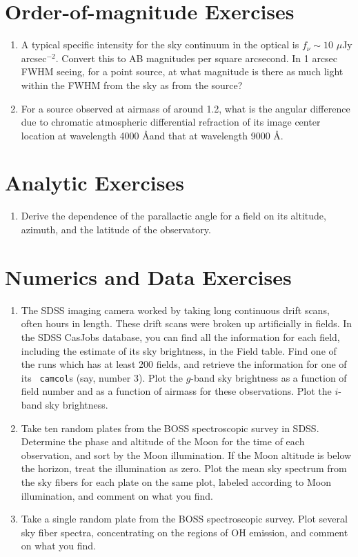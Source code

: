 \citet{gunn06a}

\section{Order-of-magnitude Exercises}

\begin{enumerate} 
\item A typical specific intensity  for the sky continuum in the
    optical is $f_\nu \sim 10$ $\mu$Jy arcsec$^{-2}$. Convert this to
    AB magnitudes per square arcsecond. In 1 arcsec FWHM seeing, for a
    point source, at what magnitude is there as much light within the
    FWHM from the sky as from the source?
\item For a source observed at airmass of around 1.2, what is the
    angular difference due to chromatic atmospheric differential
    refraction of its image center location at wavelength 4000 \AA and
    that at wavelength 9000 \AA.
\end{enumerate} 

\section{Analytic Exercises}

\begin{enumerate}
\item Derive the dependence of the parallactic angle for a field on
    its altitude, azimuth, and the latitude of the observatory.
\end{enumerate}

\section{Numerics and Data Exercises}

\begin{enumerate}
\item The SDSS imaging camera worked by taking long continuous drift
scans, often hours in length. These drift scans were broken up
artificially in fields. In the SDSS CasJobs database, you can find all
the information for each field, including the estimate of its sky
brightness, in the Field table. Find one of the runs which has at
least 200 fields, and retrieve the information for one of its {\tt
camcol}s (say, number 3). Plot the $g$-band sky brightness as a
function of field number and as a function of airmass for these
observations. Plot the $i$-band sky brightness. 
\item Take ten random plates from the BOSS spectroscopic survey in
SDSS. Determine the phase and altitude of the Moon for the time of
each observation, and sort by the Moon illumination. If the Moon
altitude is below the horizon, treat the illumination as zero. Plot
the mean sky spectrum from the sky fibers for each plate on the same
plot, labeled according to Moon illumination, and comment on what you
find.
\item Take a single random plate from the BOSS spectroscopic
survey. Plot several sky fiber spectra, concentrating on the regions
of OH emission, and comment on what you find.
\end{enumerate}

